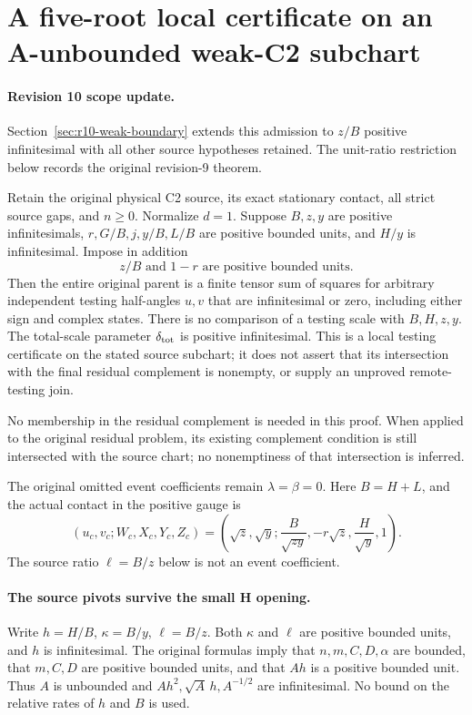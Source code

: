 \section{A five-root local certificate on an A-unbounded weak-C2 subchart}
\label{sec:r9-weak-A-five-root}

\paragraph{Revision 10 scope update.}
Section~\ref{sec:r10-weak-boundary} extends this admission to $z/B$
positive infinitesimal with all other source hypotheses retained.
The unit-ratio restriction below records the original revision-9 theorem.

\begin{theorem}
Retain the original physical C2 source, its exact stationary contact,
all strict source gaps, and $n\ge0$.
Normalize $d=1$. Suppose $B,z,y$ are positive infinitesimals,
$r,G/B,j,y/B,L/B$ are positive bounded units, and $H/y$ is
infinitesimal. Impose in addition
\[
 z/B\text{ and }1-r\text{ are positive bounded units}.       \tag{WA1}
\]
Then the entire original parent is a finite tensor sum of squares
for arbitrary independent testing half-angles $u,v$ that are
infinitesimal or zero, including either sign and complex states.
There is no comparison of a testing scale with $B,H,z,y$.
The total-scale parameter $\delta_{\rm tot}$ is positive infinitesimal.
This is a local testing certificate on the stated source subchart;
it does not assert that its intersection with the final residual
complement is nonempty, or supply an unproved remote-testing join.
\end{theorem}

No membership in the residual complement is needed in this proof.
When applied to the original residual problem, its existing complement
condition is still intersected with the source chart; no nonemptiness
of that intersection is inferred.

The original omitted event coefficients remain $\lambda=\beta=0$.
Here $B=H+L$, and the actual contact in the positive gauge is
\[
 (u_c,v_c;W_c,X_c,Y_c,Z_c)
 =\left(\sqrt z,\sqrt y;\frac B{\sqrt{zy}},
                  -r\sqrt z,\frac H{\sqrt y},1\right).
\]
The source ratio $\ell=B/z$ below is not an event coefficient.

\paragraph{The source pivots survive the small H opening.}
Write $h=H/B$, $\kappa=B/y$, $\ell=B/z$. Both $\kappa$ and
$\ell$ are positive bounded units, and $h$ is infinitesimal.
The original formulas imply that $n,m,C,D,\alpha$ are bounded,
that $m,C,D$ are positive bounded units, and that $Ah$ is a
positive bounded unit. Thus $A$ is unbounded and
$Ah^2,\sqrt A\,h,A^{-1/2}$ are infinitesimal. No bound on the
relative rates of $h$ and $B$ is used.

